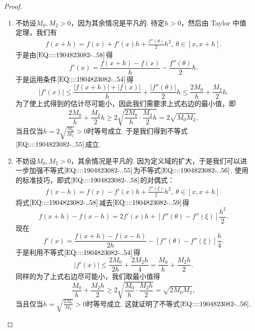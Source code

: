 \documentclass[../../main.tex]{subfiles}%
\begin{document}
\begin{proof}
\begin{enumerate}
\item 不妨设\( M_0, M_2 > 0 \)，因为其余情况是平凡的. 待定\( h > 0 \)，然后由 Taylor 中值定理，我们有
\begin{align}
f(x + h) = f(x) + f'(x)h + \frac{f''(\theta)}{2} h^2, \ \theta \in [x, x + h]. \label{EQ::::1904823082-..58}
\end{align}
于是由\(\eqref{EQ::::1904823082-..58}\)得
\[
f'(x) = \frac{f(x + h) - f(x)}{h} - \frac{f''(\theta)}{2} h.
\]
于是运用条件\(\eqref{EQ::::1904823082-..54}\)得
\[
|f'(x)| \leqslant \frac{|f(x + h)| + |f(x)|}{h} + \frac{|f''(\theta)|}{2} h \leqslant \frac{2 M_0}{h} + \frac{M_2}{2} h.
\]
为了使上式得到的估计尽可能小，因此我们需要求上式右边的最小值，即
\[
\frac{2 M_0}{h} + \frac{M_2}{2} h \geqslant 2\sqrt{\frac{2 M_0}{h} \cdot \frac{M_2}{2} h} = 2\sqrt{M_0 M_2},
\]
当且仅当\( h = 2\sqrt{\frac{M_0}{M_2}} > 0 \)时等号成立. 于是我们得到不等式\(\eqref{EQ::::1904823082-..55}\)成立.

\item 不妨设\( M_0, M_2 > 0 \)，其余情况是平凡的. 因为定义域的扩大，于是我们可以进一步加强不等式\(\eqref{EQ::::1904823082-..55}\)为不等式\(\eqref{EQ::::1904823082-..56}\). 使用的标准技巧，即式\(\eqref{EQ::::1904823082-..58}\)的对偶式：
\begin{align}
f(x - h) = f(x) - f'(x)h + \frac{f''(\xi)}{2} h^2, \ \theta \in [x, x + h]. \label{EQ::::1904823082-..59}
\end{align}
将式\(\eqref{EQ::::1904823082-..58}\)减去\(\eqref{EQ::::1904823082-..59}\)得
\[
f(x + h) - f(x - h) = 2 f'(x)h + \left[ f''(\theta) - f''(\xi) \right] \frac{h^2}{2}.
\]
现在
\[
f'(x) = \frac{f(x + h) - f(x - h)}{2h} - \left[ f''(\theta) - f''(\xi) \right] \frac{h}{4}.
\]
于是利用不等式\(\eqref{EQ::::1904823082-..54}\)得
\[
|f'(x)| \leqslant \frac{2 M_0}{2h} + \frac{2 M_2 h}{4} = \frac{M_0}{h} + \frac{M_2 h}{2}.
\]
同样的为了上式右边尽可能小，我们取最小值得
\[
\frac{M_0}{h} + \frac{M_2 h}{2} \geqslant 2\sqrt{\frac{M_0}{h} \cdot \frac{M_2 h}{2}} = \sqrt{2 M_0 M_2},
\]
当且仅当\( h = \sqrt{\frac{2 M_0}{M_2}} > 0 \)时等号成立. 这就证明了不等式\(\eqref{EQ::::1904823082-..56}\).


\end{enumerate}
\end{proof}
\end{document}
